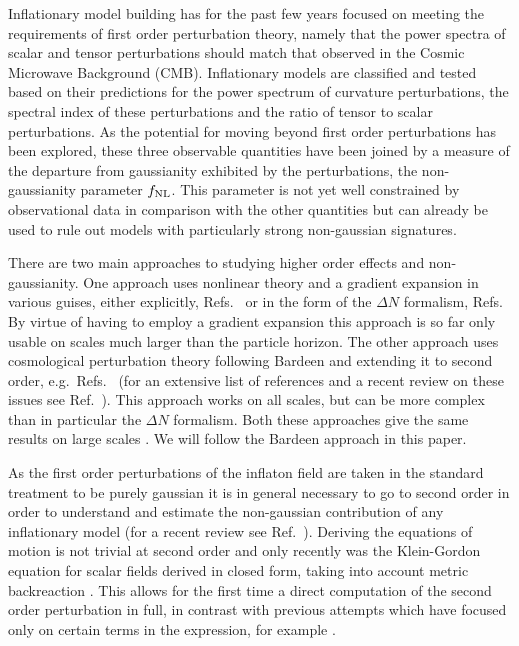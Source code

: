 Inflationary model building has for the past few years focused on
meeting the requirements of first order perturbation theory, namely
that the power spectra of scalar and tensor perturbations should match
that observed in the Cosmic Microwave Background (CMB).  Inflationary
models are classified and tested based on their predictions for the
power spectrum of curvature perturbations, the spectral index of these
perturbations and the ratio of tensor to scalar perturbations.  As the
potential for moving beyond first order perturbations has been
explored, these three observable quantities have been joined by a
measure of the departure from gaussianity exhibited by the
perturbations, the non-gaussianity parameter $f_{\mathrm{NL}}$. This parameter is
not yet well constrained by observational data in comparison with the
other quantities but can already be used to rule out models with
particularly strong non-gaussian signatures.


There are two main approaches to studying higher order effects and
non-gaussianity.  
One approach uses nonlinear theory and a gradient expansion in various
guises, either explicitly, \eg
Refs.~\cite{Salopek:1990jq,Rigopoulos:2005xx} or in the form of the
$\Delta N$ formalism, \eg
Refs.~\cite{Starobinsky:1982ee,
Starobinsky:1986fxa, Sasaki:1995aw, Sasaki:1998ug,
Lyth:2004gb,Lyth:2005fi,Langlois:2006vv}
By virtue of having to employ a gradient expansion this approach is so
far only usable on scales much larger than the particle horizon.  The
other approach uses cosmological perturbation theory following Bardeen
\cite{Bardeen:1980kt} and extending it to second order,
e.g.~Refs.~\cite{Tomita:1967,Mukhanov:1996ak,Bruni:1996im,
  Acquaviva:2002ud,Nakamura:2003wk,Noh:2004bc,
  Bernardeau:2002jy,Maldacena:2002vr,
  Finelli:2003bp,Bartolo:2004if,Enqvist:2004bk,Lyth:2005du,Seery:2005gb,
  Malik:2003mv, Barnaby:2006cq}
(for an extensive list of references and a recent review on these
issues see Ref.~\cite{Malik:2008im}).
%
This approach works on all scales, but can be more complex than in
particular the $\Delta N$ formalism. Both these approaches give the
same results on large scales \cite{Malik:2005cy}. We
will follow the Bardeen approach in this paper.

As the first order perturbations of the inflaton field are taken in
the standard treatment to be purely gaussian it is in general
necessary to go to second order in order to understand and estimate
the non-gaussian contribution of any inflationary model (for a recent
review see Ref.~\cite{Malik:2008im}). Deriving the equations of motion is
not trivial at second order and only recently was the Klein-Gordon
equation for scalar fields derived in closed form, taking into account
metric backreaction \cite{Malik:2006ir}. This allows for the first time
a direct computation of the second order perturbation in full, in
contrast with previous attempts which have focused only on certain
terms in the expression, for example .


